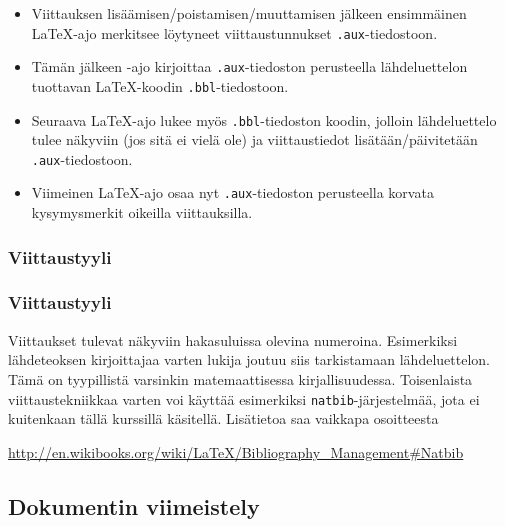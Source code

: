 \begin{frame}[fragile]
    \begin{extra}
        \begin{itemize}
            \item Viittauksen lisäämisen/poistamisen/muuttamisen jälkeen ensimmäinen \LaTeX-ajo merkitsee löytyneet viittaustunnukset \verb-.aux--tiedostoon.
            \item Tämän jälkeen \BibTeX-ajo kirjoittaa \verb-.aux--tiedoston perusteella lähdeluettelon tuottavan \LaTeX-koodin \verb-.bbl--tiedostoon.
            \item Seuraava \LaTeX-ajo lukee myös \verb-.bbl--tiedoston koodin, jolloin lähdeluettelo tulee näkyviin (jos sitä ei vielä ole) ja viittaustiedot lisätään/päivitetään \verb-.aux--tiedostoon.
            \item Viimeinen \LaTeX-ajo osaa nyt \verb-.aux--tiedoston perusteella korvata kysymysmerkit oikeilla viittauksilla.
        \end{itemize}
    \end{extra}
\end{frame}
%
\subsubsection{Viittaustyyli}
\begin{frame}[fragile]
    \frametitle{Viittaustyyli}
    Viittaukset tulevat näkyviin hakasuluissa olevina numeroina. Esimerkiksi lähdeteoksen kirjoittajaa varten lukija joutuu siis tarkistamaan lähdeluettelon. Tämä on tyypillistä varsinkin matemaattisessa kirjallisuudessa. 
    \vaihto
    Toisenlaista viittaustekniikkaa varten voi käyttää esimerkiksi \verb-natbib--järjestelmää, jota ei kuitenkaan tällä kurssillä käsitellä. Lisätietoa saa vaikkapa osoitteesta
    \begin{scriptsize}
        \url{http://en.wikibooks.org/wiki/LaTeX/Bibliography_Management#Natbib}
    \end{scriptsize}
\end{frame}
\subsection{Dokumentin viimeistely}

